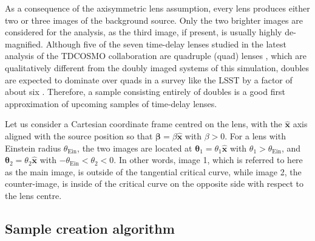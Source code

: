 \documentclass{aa}
\def\tein{\theta_{\mathrm{Ein}}}
\begin{document}
As a consequence of the axisymmetric lens assumption, every lens produces either two or three images of the background source. Only the two brighter images are considered for the analysis, as the third image, if present, is usually highly de-magnified. 
Although five of the seven time-delay lenses studied in the latest analysis of the TDCOSMO collaboration are quadruple (quad) lenses \citep{Bir++20}, which are qualitatively different from the doubly imaged systems of this simulation, doubles are expected to dominate over quads in a survey like the LSST by a factor of about six \citep{O+M10}.
Therefore, a sample consisting entirely of doubles is a good first approximation of upcoming samples of time-delay lenses.

Let us consider a Cartesian coordinate frame centred on the lens, with the $\hat{\mathbf{x}}$ axis aligned with the source position so that $\boldsymbol{\beta} = \beta\hat{\mathbf{x}}$ with $\beta > 0$.
For a lens with Einstein radius $\tein$, the two images are located at $\boldsymbol\theta_1 = \theta_1\hat{\mathbf{x}}$ with $\theta_1 > \tein$, and $\boldsymbol\theta_2 = \theta_2\hat{\mathbf{x}}$ with $-\tein < \theta_2 < 0$.
In other words, image 1, which is referred to here as the main image, is outside of the tangential critical curve, while image 2, the counter-image, is inside of the critical curve on the opposite side with respect to the lens centre.

\subsection{Sample creation algorithm}\label{ssec:algorithm}
\end{document}
